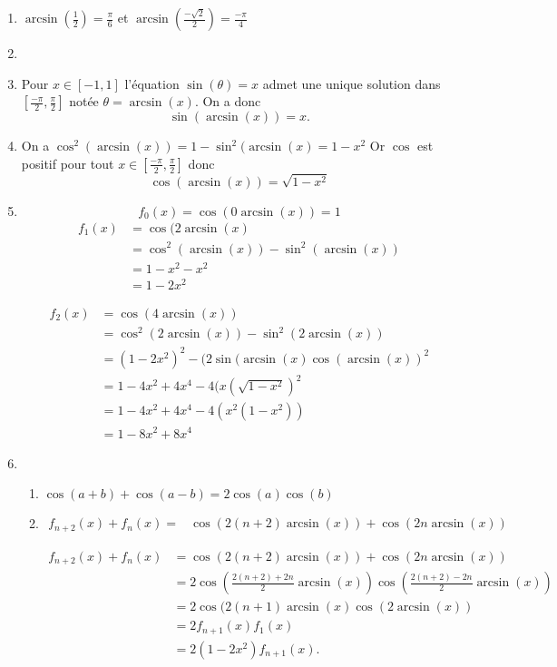 \begin{correction}
\begin{enumerate}
\item $\arcsin(\frac{1}{2})= \frac{\pi}{6}$ et $\arcsin(\frac{-\sqrt{2}}{2})= \frac{-\pi}{4}$

\item 

\item Pour $x\in [-1, 1]$ l'équation $\sin(\theta)=x$ admet une unique solution dans $[\frac{-\pi}{2}, \frac{\pi}{2}]$ notée 
$\theta=\arcsin(x)$. On a donc 
$$\sin(\arcsin(x)) = x.$$

\item On a $\cos^2(\arcsin(x)) =1-\sin^2(\arcsin(x)=1-x^2$
Or $\cos$ est positif pour tout $x\in [\frac{-\pi}{2}, \frac{\pi}{2}]$ donc 
$$\cos(\arcsin(x)) =\sqrt{1-x^2}$$

\item $$f_0(x) = \cos(0 \arcsin(x)) = 1$$
\begin{align*}
f_1(x) &= \cos(2 \arcsin(x)\\
		&= \cos^2(\arcsin(x)) -\sin^2(\arcsin(x))\\
		&=1-x^2-x^2\\
		&=1-2x^2
\end{align*}


\begin{align*}
f_2(x) &= \cos(4 \arcsin(x))\\
		&= \cos^2(2\arcsin(x)) -\sin^2(2\arcsin(x))\\
		&=(1-2x^2)^2-(2\sin(\arcsin(x)\cos(\arcsin(x))^2\\
		&=1-4x^2+4x^4 - 4(x(\sqrt{1-x^2})^2\\
		&=1-4x^2+4x^4 - 4(x^2(1-x^2))\\
		&=1-8x^2+8x^4
\end{align*}

\item
\begin{enumerate}
\item $\cos(a+b)+\cos(a-b)= 2\cos(a)\cos(b)$
\item 
\begin{align*}
f_{n+2} (x) + f_n(x) =&  \cos(2(n+2) \arcsin(x))  + \cos(2n \arcsin(x)) 
\end{align*}

\begin{align*}
f_{n+2} (x)  +f_n(x)&= \cos(2(n+2) \arcsin(x))  +  \cos(2n \arcsin(x))\\
							&=2 \cos\left(\frac{2(n+2)+2n}{2} \arcsin(x)\right) \cos\left(\frac{2(n+2)-2n}{2} \arcsin(x)\right)\\
							&=2\cos(2(n+1) \arcsin(x) \cos(2\arcsin(x))\\
							&=2 f_{n+1}(x) f_1(x)\\
							&=2(1-2x^2) f_{n+1}(x).
\end{align*}

\end{enumerate}
\end{enumerate}
\end{correction}